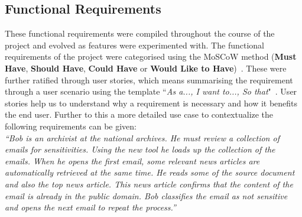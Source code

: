\documentclass{l4proj}
\begin{document}
\subsection{Functional Requirements}
These functional requirements were compiled throughout the course of the project and evolved as features were experimented with.
The functional requirements of the project were categorised using the MoSCoW method (\textbf{Must Have}, \textbf{Should Have}, \textbf{Could Have} or \textbf{Would Like to Have})~\cite{storer_lecture_2014}. These were further ratified through user stories, which means summarising the requirement through a user scenario using the template ``\textit{As a..., I want to..., So that}"~\cite{storer_lecture_2014}. User stories help us to understand why a requirement is necessary and how it benefits the end user. Further to this a more detailed use case to contextualize the following requirements can be given:\\ 
\textit{``Bob is an archivist at the national archives. He must review a collection of emails for sensitivities. Using the new tool he loads up the collection of the emails. When he opens the first email, some relevant news articles are automatically retrieved at the same time. He reads some of the source document and also the top news article. This news article confirms that the content of the email is already in the public domain. Bob classifies the email as not sensitive and opens the next email to repeat the process.''}
\end{document}
